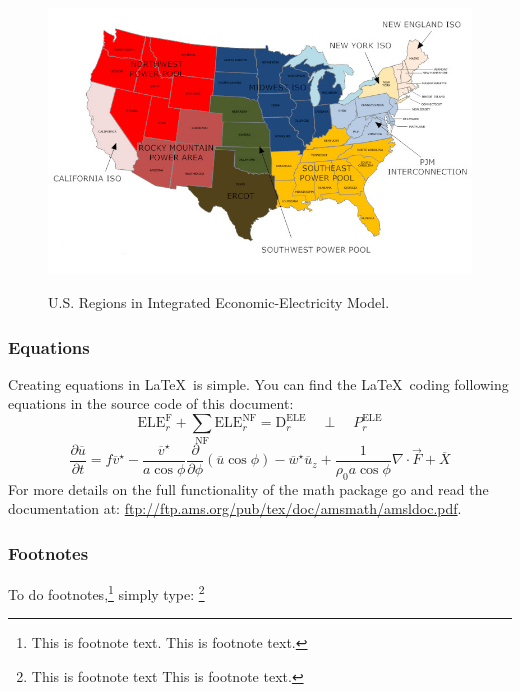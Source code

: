 \documentclass[12pt,fleqn]{article}
\let\oldverbatim\verbatim
\let\oldendverbatim\endverbatim
\renewenvironment{verbatim}{\endgraf\footnotesize\singlespace\oldverbatim}{\oldendverbatim\endsinglespace}
\begin{document}
\begin{figure}[h]
  \centering
  \noindent\includegraphics[width=13cm]{../figure/MapUS12.jpg}\\
  \caption{U.S. Regions in Integrated Economic-Electricity Model.}\label{fig:mapregionalaggregation}
\end{figure}

\subsubsection{Equations}

Creating equations in \LaTeX\, is simple. You can find the \LaTeX\, coding following equations in the source code of this document:
\begin{equation}\label{eq1}
\text{ELE}^{\text{F}}_r + \sum_{\text{NF}} \text{ELE}^{\text{NF}}_r = \text{D}^{\text{ELE}}_r \quad \perp \quad P^{\text{ELE}}_r
\end{equation}
\begin{equation}\label{eq2}
\frac{\partial \overline{u}}{\partial t}=f\overline{v}^\star-\frac{\overline{v}^\star}{a\cos \phi} \frac{\partial}{\partial \phi} \left(\overline{u} \cos \phi \right)-\overline{w}^\star \overline{u}_{z}+\frac{1}{\rho_{0} a \cos \phi}\nabla\cdot\vec{F}+\overline{X}
\end{equation}
For more details on the full functionality of the math package go and read the documentation at: \url{ftp://ftp.ams.org/pub/tex/doc/amsmath/amsldoc.pdf}.


\subsubsection{Footnotes}

To do footnotes,\footnote{This is footnote text. This is footnote text.} simply
type:
\begin{verbatim}
\footnote{This is footnote text This is footnote text.}
\end{verbatim}
\end{document}
